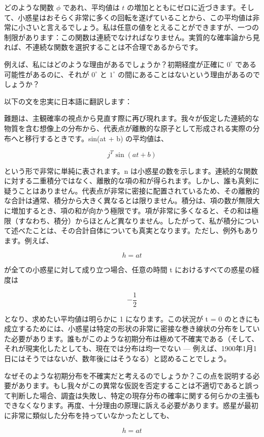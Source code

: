 \documentclass[a4paper,11pt,openany]{ltjsbook}
\begin{document}
どのような関数 \(\phi\) であれ、平均値は \( t \) の増加とともにゼロに近づきます。そして、小惑星はおそらく非常に多くの回転を遂げていることから、この平均値は非常に小さいと言えるでしょう。私は任意の値をとえることができますが、一つの制限があります：この関数は連続でなければなりません。実質的な確率論から見れば、不連続な関数を選択することは不合理であるからです。

例えば、私にはどのような理由があるでしょうか？初期経度が正確に \(0^\circ\) である可能性があるのに、それが \(0^\circ\) と \(1^\circ\) の間にあることはないという理由があるのでしょうか？

以下の文を忠実に日本語に翻訳します：

難題は、主観確率の視点から見直す際に再び現れます。我々が仮定した連続的な物質を含む想像上の分布から、代表点が離散的な原子として形成される実際の分布へと移行するときです。sin(at + b) の平均値は、

\[j^T \sin (at + b)\]

という形で非常に単純に表されます。n は小惑星の数を示します。連続的な関数に対する二重積分ではなく、離散的な項の和が得られます。しかし、誰も真剣に疑うことはありません。代表点が非常に密接に配置されているため、その離散的な合計は通常、積分から大きく異なるとは限りません。積分は、項の数が無限大に増加するとき、項の和が向かう極限です。項が非常に多くなると、その和は極限（すなわち、積分）からほとんど異なりません。したがって、私が積分について述べたことは、その合計自体についても真実となります。ただし、例外もあります。例えば、

\[h = at\]

が全ての小惑星に対して成り立つ場合、任意の時間 t におけるすべての惑星の経度は

\[-\frac{1}{2}\]

となり、求めたい平均値は明らかに 1 になります。この状況が t = 0 のときにも成立するためには、小惑星は特定の形状の非常に密接な巻き線状の分布をしていた必要があります。誰もがこのような初期分布は極めて不確実である（そして、それが現実化したとしても、現在では分布は均一でない — 例えば、1900年1月1日にはそうではないが、数年後にはそうなる）と認めることでしょう。

なぜそのような初期分布を不確実だと考えるのでしょうか？この点を説明する必要があります。もし我々がこの異常な仮説を否定することは不適切であると誤って判断した場合、調査は失敗し、特定の現存分布の確率に関する何らかの主張もできなくなります。再度、十分理由の原理に訴える必要があります。惑星が最初に非常に類似した分布を持っていなかったとしても、

\[h = at\]
\end{document}
